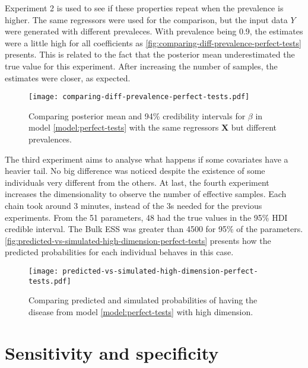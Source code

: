 Experiment 2 is used to see if these properties repeat when the prevalence is
higher. The same regressors were used for the comparison, but the input data
$Y$ were generated with different prevaleces. With prevalence being 0.9, the
estimates were a little high for all coefficients as
\autoref{fig:comparing-diff-prevalence-perfect-tests} presents. This is
related to the fact that the posterior mean underestimated the true value for this
experiment. After increasing the number of samples, the estimates were closer,
as expected. 

\begin{figure}[!ht]
  \centering  
  \caption{\label{fig:comparing-diff-prevalence-perfect-tests}Comparing
  posterior mean and 94\% credibility intervals for $\beta$ in model \eqref{model:perfect-tests} with the same regressors
  $\boldsymbol{X}$ but different prevalences.}
  \texttt{[image: comparing-diff-prevalence-perfect-tests.pdf]}
\end{figure} 

The third experiment aims to analyse what happens if some covariates have a
heavier tail. No big difference was noticed despite the existence of some
individuals very different from the others. At last, the fourth experiment
increases the dimensionality to observe the number of effective samples. Each
chain took around 3 minutes, instead of the 3s needed for the previous
experiments. From the 51 parameters, 48 had the true values in the 95\% HDI
credible interval. The Bulk ESS was greater than 4500 for 95\% of the
parameters. \autoref{fig:predicted-vs-simulated-high-dimension-perfect-tests}
presents how the predicted probabilities for each individual behaves in this
case. 

\begin{figure}[!hb]
  \centering  
  \caption{\label{fig:predicted-vs-simulated-high-dimension-perfect-tests}
  Comparing predicted and simulated probabilities of having the disease from
  model \eqref{model:perfect-tests} with high dimension.}
  \texttt{[image: predicted-vs-simulated-high-dimension-perfect-tests.pdf]}
\end{figure} 

\section{Sensitivity and specificity}

